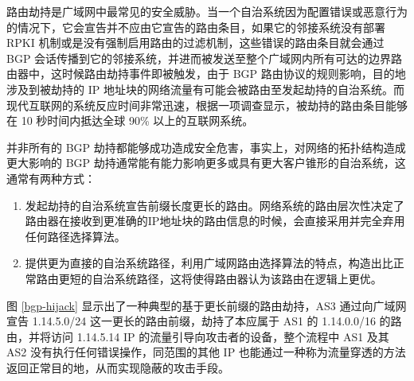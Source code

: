 


路由劫持是广域网中最常见的安全威胁。当一个自治系统因为配置错误或恶意行为的情况下，它会宣告并不应由它宣告的路由条目，如果它的邻接系统没有部署 RPKI 机制或是没有强制启用路由的过滤机制，这些错误的路由条目就会通过 BGP 会话传播到它的邻接系统，并进而被发送至整个广域网内所有可达的边界路由器中，这时候路由劫持事件即被触发，由于 BGP 路由协议的规则影响，目的地涉及到被劫持的 IP 地址块的网络流量有可能会被路由至发起劫持的自治系统。而现代互联网的系统反应时间非常迅速，根据一项调查显示，被劫持的路由条目能够在 10 秒时间内抵达全球 90\% 以上的互联网系统。

并非所有的 BGP 劫持都能够成功造成安全危害，事实上，对网络的拓扑结构造成更大影响的 BGP 劫持通常能有能力影响更多或具有更大客户锥形的自治系统，这通常有两种方式：

\begin{enumerate}
    \item 发起劫持的自治系统宣告前缀长度更长的路由。网络系统的路由层次性决定了路由器在接收到更准确的IP地址块的路由信息的时候，会直接采用并完全弃用任何路径选择算法。
    \item 提供更为直接的自治系统路径，利用广域网路由选择算法的特点，构造出比正常路由更短的自治系统路径，这将使得路由器认为该路由在逻辑上更优。
\end{enumerate}


图 \ref{bgp-hijack} 显示出了一种典型的基于更长前缀的路由劫持，AS3 通过向广域网宣告 1.14.5.0/24 这一更长的路由前缀，劫持了本应属于 AS1 的 1.14.0.0/16 的路由，并将访问 1.14.5.14 IP 的流量引导向攻击者的设备，整个流程中 AS1 及其 AS2 没有执行任何错误操作，同范围的其他 IP 也能通过一种称为流量穿透的方法返回正常目的地，从而实现隐蔽的攻击手段。

